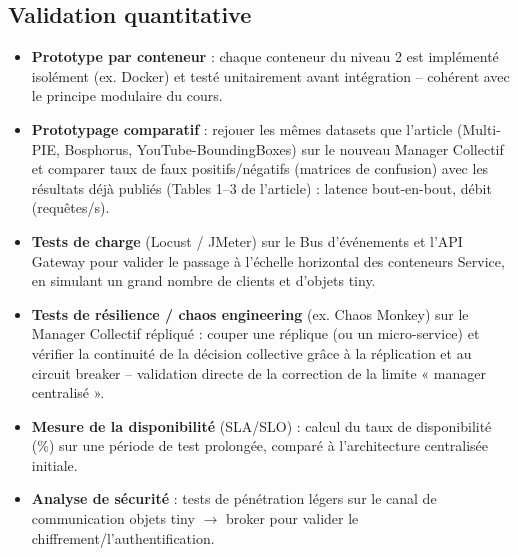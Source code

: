 \documentclass[11pt,a4paper]{article}
\begin{document}
\subsection{Validation quantitative}
\begin{itemize}
\item \textbf{Prototype par conteneur} : chaque conteneur du niveau 2 est implémenté isolément (ex. Docker) et testé unitairement avant intégration -- cohérent avec le principe modulaire du cours.
\item \textbf{Prototypage comparatif} : rejouer les mêmes datasets que l'article (Multi-PIE, Bosphorus, YouTube-BoundingBoxes) sur le nouveau Manager Collectif et comparer taux de faux positifs/négatifs (matrices de confusion) avec les résultats déjà publiés (Tables 1--3 de l'article) : latence bout-en-bout, débit (requêtes/s).
\item \textbf{Tests de charge} (Locust / JMeter) sur le Bus d'événements et l'API Gateway pour valider le passage à l'échelle horizontal des conteneurs Service, en simulant un grand nombre de clients et d'objets tiny.
\item \textbf{Tests de résilience / chaos engineering} (ex. Chaos Monkey) sur le Manager Collectif répliqué : couper une réplique (ou un micro-service) et vérifier la continuité de la décision collective grâce à la réplication et au circuit breaker -- validation directe de la correction de la limite « manager centralisé ».
\item \textbf{Mesure de la disponibilité} (SLA/SLO) : calcul du taux de disponibilité (\%) sur une période de test prolongée, comparé à l'architecture centralisée initiale.
\item \textbf{Analyse de sécurité} : tests de pénétration légers sur le canal de communication objets tiny $\rightarrow$ broker pour valider le chiffrement/l'authentification.
\end{itemize}
\end{document}

